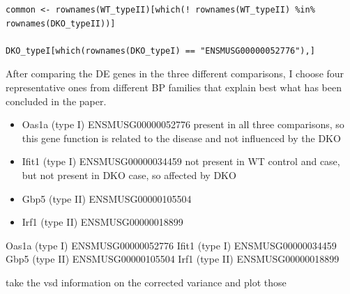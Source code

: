 \documentclass[
]{article}
\providecommand{\tightlist}{%
  \setlength{\itemsep}{0pt}\setlength{\parskip}{0pt}}
\begin{document}
\begin{verbatim}
common <- rownames(WT_typeII)[which(! rownames(WT_typeII) %in% rownames(DKO_typeII))]

DKO_typeI[which(rownames(DKO_typeI) == "ENSMUSG00000052776"),]
\end{verbatim}

After comparing the DE genes in the three different comparisons, I
choose four representative ones from different BP families that explain
best what has been concluded in the paper.

\begin{itemize}
\tightlist
\item
  Oas1a (type I) ENSMUSG00000052776 present in all three comparisons, so
  this gene function is related to the disease and not influenced by the
  DKO
\item
  Ifit1 (type I) ENSMUSG00000034459 not present in WT control and case,
  but not present in DKO case, so affected by DKO
\item
  Gbp5 (type II) ENSMUSG00000105504 \textbar\textbar{}
\item
  Irf1 (type II) ENSMUSG00000018899 \textbar\textbar{}
\end{itemize}

Oas1a (type I) ENSMUSG00000052776 Ifit1 (type I) ENSMUSG00000034459 Gbp5
(type II) ENSMUSG00000105504 Irf1 (type II) ENSMUSG00000018899

take the vsd information on the corrected variance and plot those
\end{document}
